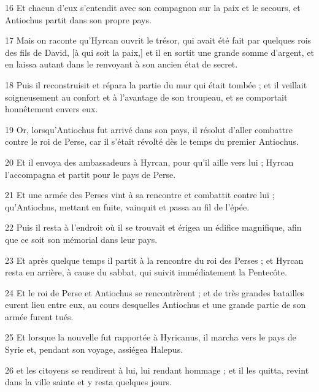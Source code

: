 \par 16 Et chacun d'eux s'entendit avec son compagnon sur la paix et le secours, et Antiochus partit dans son propre pays.

\par 17 Mais on raconte qu'Hyrcan ouvrit le trésor, qui avait été fait par quelques rois des fils de David, [à qui soit la paix,] et il en sortit une grande somme d'argent, et en laissa autant dans le renvoyant à son ancien état de secret.

\par 18 Puis il reconstruisit et répara la partie du mur qui était tombée ; et il veillait soigneusement au confort et à l'avantage de son troupeau, et se comportait honnêtement envers eux.

\par 19 Or, lorsqu'Antiochus fut arrivé dans son pays, il résolut d'aller combattre contre le roi de Perse, car il s'était révolté dès le temps du premier Antiochus.

\par 20 Et il envoya des ambassadeurs à Hyrcan, pour qu'il aille vers lui ; Hyrcan l'accompagna et partit pour le pays de Perse.

\par 21 Et une armée des Perses vint à sa rencontre et combattit contre lui ; qu'Antiochus, mettant en fuite, vainquit et passa au fil de l'épée.

\par 22 Puis il resta à l'endroit où il se trouvait et érigea un édifice magnifique, afin que ce soit son mémorial dans leur pays.

\par 23 Et après quelque temps il partit à la rencontre du roi des Perses ; et Hyrcan resta en arrière, à cause du sabbat, qui suivit immédiatement la Pentecôte.

\par 24 Et le roi de Perse et Antiochus se rencontrèrent ; et de très grandes batailles eurent lieu entre eux, au cours desquelles Antiochus et une grande partie de son armée furent tués.

\par 25 Et lorsque la nouvelle fut rapportée à Hyricanus, il marcha vers le pays de Syrie et, pendant son voyage, assiégea Halepus.

\par 26 et les citoyens se rendirent à lui, lui rendant hommage ; et il les quitta, revint dans la ville sainte et y resta quelques jours.

